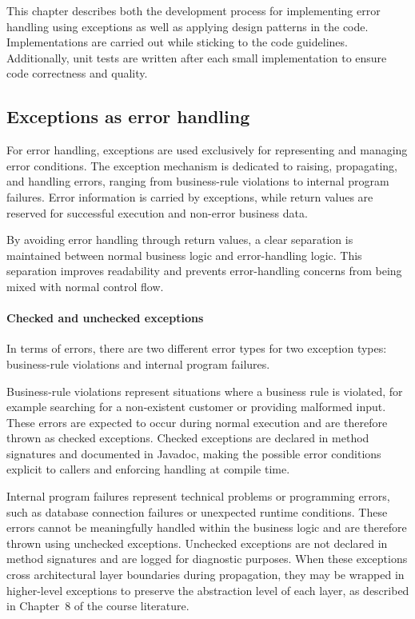 \documentclass[a4paper]{scrartcl}
\begin{document}

This chapter describes both the development process for implementing error handling using exceptions as well as applying design patterns in the code. Implementations are carried out while sticking to the code guidelines. Additionally, unit tests are written after each small implementation to ensure code correctness and quality.

\subsection{Exceptions as error handling}

For error handling, exceptions are used exclusively for representing and managing error conditions. The exception mechanism is dedicated to raising, propagating, and handling errors, ranging from business-rule violations to internal program failures. Error information is carried by exceptions, while return values are reserved for successful execution and non-error business data.

By avoiding error handling through return values, a clear separation is maintained between normal business logic and error-handling logic. This separation improves readability and prevents error-handling concerns from being mixed with normal control flow.

\paragraph{Checked and unchecked exceptions}

In terms of errors, there are two different error types for two exception types: business-rule violations and internal program failures.

Business-rule violations represent situations where a business rule is violated, for example searching for a non-existent customer or providing malformed input. These errors are expected to occur during normal execution and are therefore thrown as checked exceptions. Checked exceptions are declared in method signatures and documented in Javadoc, making the possible error conditions explicit to callers and enforcing handling at compile time.

Internal program failures represent technical problems or programming errors, such as database connection failures or unexpected runtime conditions. These errors cannot be meaningfully handled within the business logic and are therefore thrown using unchecked exceptions. Unchecked exceptions are not declared in method signatures and are logged for diagnostic purposes. When these exceptions cross architectural layer boundaries during propagation, they may be wrapped in higher-level exceptions to preserve the abstraction level of each layer, as described in Chapter~8 of the course literature.
\end{document}
